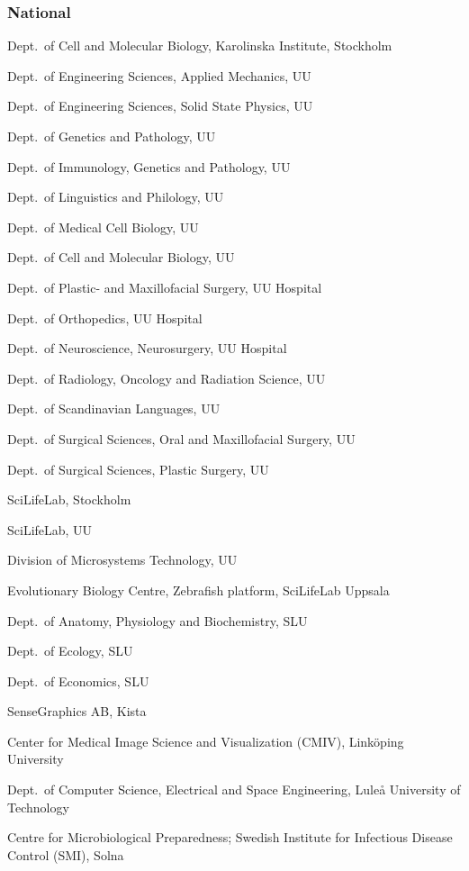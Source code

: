\subsubsection*{National}
{\small
\begin{trivlist}
\item Dept.~of Cell and Molecular Biology, Karolinska Institute, Stockholm
\item Dept.~of Engineering Sciences, Applied Mechanics, UU
\item Dept.~of Engineering Sciences, Solid State Physics, UU
\item Dept.~of Genetics and Pathology, UU
\item Dept.~of Immunology, Genetics and Pathology, UU
\item Dept.~of Linguistics and Philology, UU
\item Dept.~of Medical Cell Biology, UU
\item Dept.~of Cell and Molecular Biology, UU
\item Dept.~of Plastic- and Maxillofacial Surgery, UU Hospital
\item Dept.~of Orthopedics, UU Hospital
\item Dept.~of Neuroscience, Neurosurgery, UU Hospital
\item Dept.~of Radiology, Oncology and Radiation Science, UU
\item Dept.~of Scandinavian Languages, UU
\item Dept.~of Surgical Sciences, Oral and Maxillofacial Surgery, UU
\item Dept.~of Surgical Sciences, Plastic Surgery, UU
\item SciLifeLab, Stockholm
\item SciLifeLab, UU
\item Division of Microsystems Technology, UU
\item Evolutionary Biology Centre, Zebrafish platform, SciLifeLab Uppsala
\item Dept.~of Anatomy, Physiology and Biochemistry, SLU
\item Dept.~of Ecology, SLU
\item Dept.~of Economics, SLU
\item SenseGraphics AB, Kista
\item Center for Medical Image Science and Visualization (CMIV), Link\"{o}ping University
\item Dept.~of Computer Science, Electrical and Space Engineering, Lule\r{a} University of Technology
\item Centre for Microbiological Preparedness; Swedish Institute for Infectious Disease Control (SMI), Solna

\end{trivlist}}

